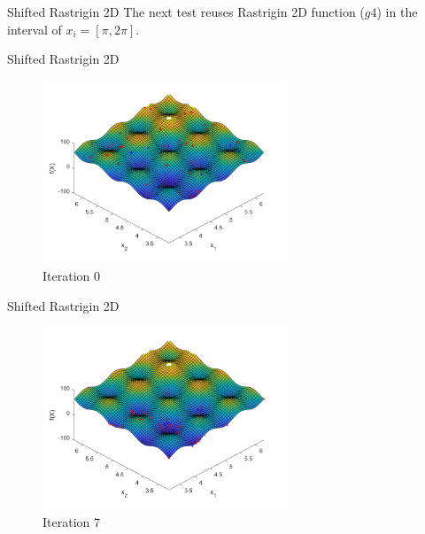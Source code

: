 \documentclass[xcolor=table]{beamer}
\begin{document}
\begin{frame}{Shifted Rastrigin 2D}
  The next test reuses Rastrigin 2D function ($g4$) in the interval of $x_i = [\pi, 2\pi]$.
\end{frame}
\begin{frame}{Shifted Rastrigin 2D}
  \begin{figure}[h]
  \begin{center}
    \includegraphics[width=0.65\textwidth]{img/smpl/rast2dshft/loa-iter-0}
    \caption{Iteration 0}
  \end{center}
  \end{figure}
\end{frame}
\begin{frame}{Shifted Rastrigin 2D}
  \begin{figure}[h]
  \begin{center}
    \includegraphics[width=0.65\textwidth]{img/smpl/rast2dshft/loa-iter-7}
    \caption{Iteration 7}
  \end{center}
  \end{figure}
\end{frame}
\end{document}
